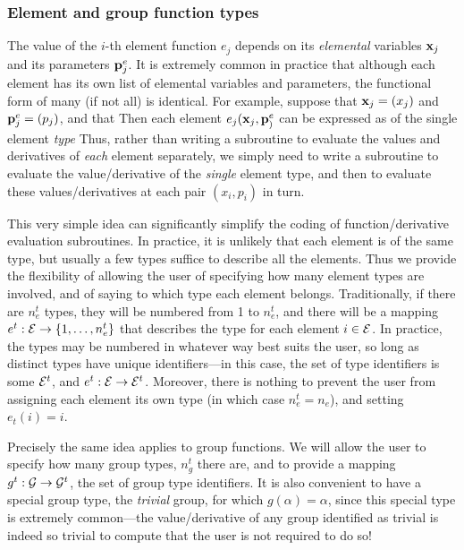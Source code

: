 \documentclass{galahad}
\newcommand{\calE}{{\cal E}}
\newcommand{\calG}{{\cal G}}
\begin{document}

\subsubsection{Element and group function types\label{ft}}

The value of the $i$-th element function $e_j$ depends on its {\em elemental}
variables ${\mathbf{x}}_j$ and its parameters ${\mathbf{p}}^e_j$. It is extremely
common in practice that although each element has its own list of
elemental variables and parameters, the functional form of many (if not
all) is identical. For example, suppose that
${\mathbf{x}}_j = ( x_j )$ and ${\mathbf{p}}^e_j = ( p_j )$,
and that
Then each element $e_j({\mathbf{x}}_j, {\mathbf{p}}^e_)$ can be expressed as
of the single element {\em type}
Thus, rather than writing a subroutine to evaluate
the values and derivatives of {\em each} element separately, we simply need to
write a subroutine to evaluate the value/derivative of the {\em single}
element type, and then to evaluate these values/derivatives at each
pair  $(x_i, p_i)$ in turn.

This very simple idea can significantly simplify the coding of
function/derivative evaluation subroutines. In practice, it is unlikely
that each element is of the same type, but usually a few types
suffice to describe all the elements. Thus we provide the flexibility
of allowing the user of specifying how many element types are involved,
and of saying to which type each element belongs. Traditionally,
if there are $n^t_e$ types, they will be numbered from 1 to $n^t_e$,
and there will be a mapping $e^t: \calE \rightarrow \{1,  \ldots, n_e^t \}$
that describes the type for each
element $i \in \calE$. In practice, the types may be numbered in whatever
way best suits the user, so long as distinct types have unique
identifiers---in this case, the set of type identifiers is some $\calE^t$, and
$e^t: \calE \rightarrow \calE^t$.
Moreover, there is nothing to prevent the user from assigning each
element its own type (in which case $n^t_e = n_e$), and setting $e_t(i) = i$.

Precisely the same idea applies to group functions. We will allow the user
to specify how many group types, $n^t_g$ there are, and to provide a
mapping $g^t: \calG \rightarrow \calG^t$, the set of group type identifiers.
It is also convenient to have a special group type,
the {\em trivial} group, for which $g(\alpha) = \alpha$, since
this special type is extremely common---the value/derivative of any group
identified as trivial is indeed so trivial to compute that the user
is not required to do so!
\end{document}
